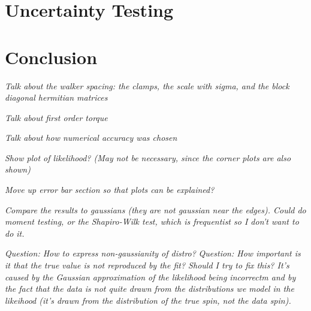 \documentclass{aastex631}
\newcommand{\jtd}[1]{{\color{red}\textit{#1}}}
\begin{document}
\section{Uncertainty Testing}


\section{Conclusion}


\jtd{Talk about the walker spacing: the clamps, the scale with sigma, and the block diagonal hermitian matrices}

\jtd{Talk about first order torque}

\jtd{Talk about how numerical accuracy was chosen}

\jtd{Show plot of likelihood? (May not be necessary, since the corner plots are also shown)}

\jtd{Move up error bar section so that plots can be explained?}

\jtd{Compare the results to gaussians (they are not gaussian near the edges). Could do moment testing, or the Shapiro-Wilk test, which is frequentist so I don't want to do it.}

\jtd{Question: How to express non-gaussianity of distro?}
\jtd{Question: How important is it that the true value is not reproduced by the fit? Should I try to fix this? It's caused by the Gaussian approximation of the likelihood being incorrectm and by the fact that the data is not quite drawn from the distributions we model in the likeihood (it's drawn from the distribution of the true spin, not the data spin).}

\vspace{5mm}



\appendix
\end{document}
